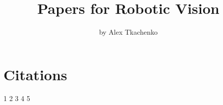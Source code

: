 \documentclass[letterpaper, 10 pt, conference]{ieeeconf}  %
\title{\LARGE \bf
Papers for Robotic Vision
}
\author{by Alex Tkachenko%
}
\begin{document}
\maketitle
\thispagestyle{empty}
\pagestyle{empty}



\section{Citations}



\cite{olson2011apriltag}
1 
\cite{wang2016apriltag}
2 
\cite{motai2008hand}
3 
\cite{Tippetts2016}
4 
\cite{kim2016real}
5 










\end{document}
